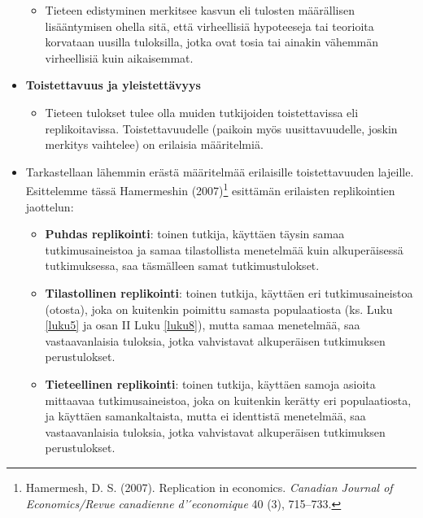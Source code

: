 \documentclass[
]{book}
\providecommand{\tightlist}{%
  \setlength{\itemsep}{0pt}\setlength{\parskip}{0pt}}
\begin{document}
\begin{defblock}{}
\begin{itemize}
  \begin{itemize}
  \tightlist
  \item
    Tieteen edistyminen merkitsee kasvun eli tulosten määrällisen lisääntymisen ohella sitä, että virheellisiä hypoteeseja tai teorioita korvataan uusilla tuloksilla, jotka ovat tosia tai ainakin vähemmän virheellisiä kuin aikaisemmat.
  \end{itemize}
\item
  \textbf{Toistettavuus ja yleistettävyys}

  \begin{itemize}
  \tightlist
  \item
    Tieteen tulokset tulee olla muiden tutkijoiden toistettavissa eli replikoitavissa. Toistettavuudelle (paikoin myös uusittavuudelle, joskin merkitys vaihtelee) on erilaisia määritelmiä.
  \end{itemize}
\end{itemize}

\end{defblock}

\begin{itemize}
\tightlist
\item
  Tarkastellaan lähemmin erästä määritelmää erilaisille toistettavuuden lajeille. Esittelemme tässä Hamermeshin (2007)\footnote{Hamermesh, D. S. (2007). Replication in economics. \emph{Canadian Journal of Economics/Revue canadienne d' ́economique} 40 (3), 715--733.} esittämän erilaisten replikointien jaottelun:

  \begin{itemize}
  \tightlist
  \item
    \textbf{Puhdas replikointi}: toinen tutkija, käyttäen täysin samaa tutkimusaineistoa ja samaa tilastollista menetelmää kuin alkuperäisessä tutkimuksessa, saa täsmälleen samat tutkimustulokset.
  \item
    \textbf{Tilastollinen replikointi}: toinen tutkija, käyttäen eri tutkimusaineistoa (otosta), joka on kuitenkin poimittu samasta populaatiosta (ks. Luku \ref{luku5} ja osan II Luku \ref{luku8}), mutta samaa menetelmää, saa vastaavanlaisia tuloksia, jotka vahvistavat alkuperäisen tutkimuksen perustulokset.
  \item
    \textbf{Tieteellinen replikointi}: toinen tutkija, käyttäen samoja asioita mittaavaa tutkimusaineistoa, joka on kuitenkin kerätty eri populaatiosta, ja käyttäen samankaltaista, mutta ei identtistä menetelmää, saa vastaavanlaisia tuloksia, jotka vahvistavat alkuperäisen tutkimuksen perustulokset.
  \end{itemize}
\end{itemize}
\end{document}
